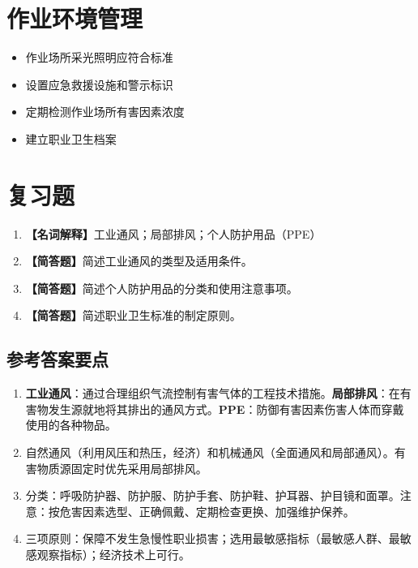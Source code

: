\section{作业环境管理}

\begin{itemize}[leftmargin=*]
    \item 作业场所采光照明应符合标准
    \item 设置应急救援设施和警示标识
    \item 定期检测作业场所有害因素浓度
    \item 建立职业卫生档案
\end{itemize}

\section{复习题}

\begin{enumerate}[leftmargin=*, itemsep=8pt]
    \item \textbf{【名词解释】}工业通风；局部排风；个人防护用品（PPE）
    \item \textbf{【简答题】}简述工业通风的类型及适用条件。
    \item \textbf{【简答题】}简述个人防护用品的分类和使用注意事项。
    \item \textbf{【简答题】}简述职业卫生标准的制定原则。
\end{enumerate}

\subsection*{参考答案要点}

\begin{enumerate}[leftmargin=*]
    \item \textbf{工业通风}：通过合理组织气流控制有害气体的工程技术措施。\textbf{局部排风}：在有害物发生源就地将其排出的通风方式。\textbf{PPE}：防御有害因素伤害人体而穿戴使用的各种物品。
    \item 自然通风（利用风压和热压，经济）和机械通风（全面通风和局部通风）。有害物质源固定时优先采用局部排风。
    \item 分类：呼吸防护器、防护服、防护手套、防护鞋、护耳器、护目镜和面罩。注意：按危害因素选型、正确佩戴、定期检查更换、加强维护保养。
    \item 三项原则：保障不发生急慢性职业损害；选用最敏感指标（最敏感人群、最敏感观察指标）；经济技术上可行。
\end{enumerate}

\newpage

\newpage